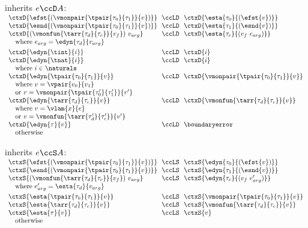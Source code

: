 \begin{flushleft}
\medskip
\begin{minipage}[t]{\columnwidth}
 inherits $e \ccD A$:\\
$\begin{array}{l@{~~}c@{~~}l}
  \ctxD{\efst{(\vmonpair{\tpair{\tau_0}{\tau_1}}{v})}} & \ccLD & \ctxD{\esta{\tau_0}{(\efst{v})}}
\\
  \ctxD{\esnd{(\vmonpair{\tpair{\tau_0}{\tau_1}}{v})}} & \ccLD & \ctxD{\esta{\tau_1}{(\esnd{v})}}
\\
  \ctxD{(\vmonfun{\tarr{\tau_d}{\tau_c}}{v_f})~v_{arg}} & \ccLD & \ctxD{\esta{\tau_c}{(v_f~e_{arg})}}
\\ \multicolumn{3}{l}{\mbox{\quad where $e_{arg} = \edyn{\tau_d}{v_{arg}}$}}
\\[0.8ex]
  \ctxD{\edyn{\tint}{i}} & \ccLD & \ctxD{i}
\\
  \ctxD{\edyn{\tnat}{i}} & \ccLD & \ctxD{i}
\\ \multicolumn{3}{l}{\mbox{\quad where $i \in \naturals$}}
\\
  \ctxD{\edyn{\tpair{\tau_0}{\tau_1}}{v}} & \ccLD & \ctxD{\vmonpair{\tpair{\tau_0}{\tau_1}}{v}}
\\ \multicolumn{3}{l}{\mbox{\quad where $v = \vpair{v_0}{v_1}$}}
\\ \multicolumn{3}{l}{\mbox{\quad or $v = \vmonpair{\tpair{\tau_0'}{\tau_1'}}{v'}$}}
\\
  \ctxD{\edyn{\tarr{\tau_d}{\tau_c}}{v}} & \ccLD & \ctxD{\vmonfun{\tarr{\tau_d}{\tau_c}}{v}}
\\ \multicolumn{3}{l}{\mbox{\quad where $v = \vlam{x}{e}$}}
\\ \multicolumn{3}{l}{\mbox{\quad or $v = \vmonfun{\tarr{\tau_d'}{\tau_c'}}{v'}$}}
\\
  \ctxD{\edyn{\tau}{v}} & \ccLD & \boundaryerror
\\ \multicolumn{3}{l}{\mbox{\quad otherwise}}
\end{array}$
\end{minipage}%
\begin{minipage}[t]{\columnwidth}
 inherits $e \ccS A$:\\
$\begin{array}{l@{~~}c@{~~}l}
  \ctxS{\efst{(\vmonpair{\tpair{\tau_0}{\tau_1}}{v})}} & \ccLS & \ctxS{\edyn{\tau_0}{(\efst{v})}}
\\
  \ctxS{\esnd{(\vmonpair{\tpair{\tau_0}{\tau_1}}{v})}} & \ccLS & \ctxS{\edyn{\tau_1}{(\esnd{v})}}
\\
  \ctxS{(\vmonfun{\tarr{\tau_d}{\tau_c}}{v_f})~v_{arg}} & \ccLS & \ctxS{\edyn{\tau_c}{(v_f~e_{arg}')}}
\\ \multicolumn{3}{l}{\mbox{\quad where $e_{arg}' = \esta{\tau_d}{v_{arg}}$}}
\\[0.8ex]
  \ctxS{\esta{\tpair{\tau_0}{\tau_1}}{v}} & \ccLS & \ctxS{\vmonpair{\tpair{\tau_0}{\tau_1}}{v}}
\\
  \ctxS{\esta{\tarr{\tau_d}{\tau_c}}{v}} & \ccLS & \ctxS{\vmonfun{\tarr{\tau_d}{\tau_c}}{v}}
\\
  \ctxS{\esta{\tau}{v}} & \ccLS & \ctxS{v}
\\ \multicolumn{3}{l}{\mbox{\quad otherwise}}
\end{array}$


\end{minipage}
\end{flushleft}
